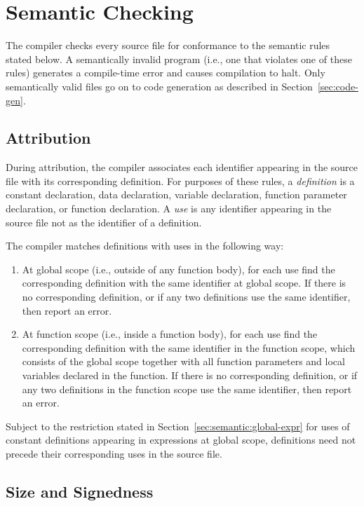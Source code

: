 \documentclass[10pt]{article}
\begin{document}
\section{Semantic Checking}
\label{sec:semantics}

The compiler checks every source file for conformance to the semantic
rules stated below.  A semantically invalid program (i.e., one that
violates one of these rules) generates a compile-time error and causes
compilation to halt.  Only semantically valid files go on to code
generation as described in Section~\ref{sec:code-gen}.

\subsection{Attribution}
\label{sec:semantics:attr}

During attribution, the compiler associates each identifier appearing
in the source file with its corresponding definition.  For purposes of
these rules, a \emph{definition} is a constant declaration, data
declaration, variable declaration, function parameter declaration, or
function declaration.  A \emph{use} is any identifier appearing in the
source file not as the identifier of a definition.

The compiler matches definitions with uses in the following way:
%
\begin{enumerate}
%
\item At global scope (i.e., outside of any function body), for each
  use find the corresponding definition with the same identifier at
  global scope.  If there is no corresponding definition, or if any
  two definitions use the same identifier, then  report an error.
%
\item At function scope (i.e., inside a function body), for each use
  find the corresponding definition with the same identifier in the
  function scope, which consists of the global scope together with all
  function parameters and local variables declared in the function.
  If there is no corresponding definition, or if any two definitions
  in the function scope use the same identifier, then report an error.
%
\end{enumerate}
% 
Subject to the restriction stated in
Section~\ref{sec:semantic:global-expr} for uses of constant
definitions appearing in expressions at global scope, definitions need
not precede their corresponding uses in the source file.

\subsection{Size and Signedness}
\label{sec:semantics:size}
\end{document}

